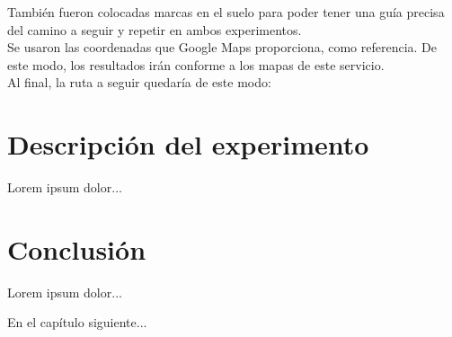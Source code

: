 También fueron colocadas marcas en el suelo para poder tener una guía precisa del camino a seguir y repetir en ambos experimentos. \\

Se usaron las coordenadas que Google Maps proporciona, como referencia. De este modo, los resultados irán conforme a los mapas de este servicio. \\

Al final, la ruta a seguir quedaría de este modo:

\section{Descripción del experimento}

Lorem ipsum dolor...

\section{Conclusión}

Lorem ipsum dolor...

En el capítulo siguiente...